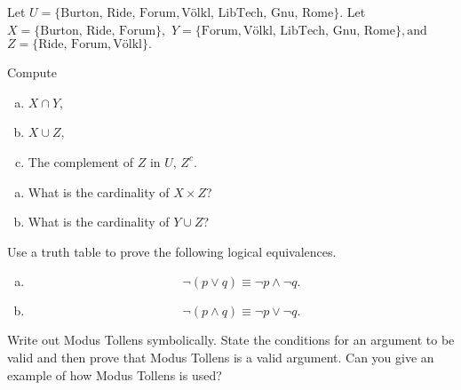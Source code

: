\documentclass[12pt]{amsart}
\begin{document}
\newpage

\noindent Let $U = \{\text{Burton},\, \text{Ride},\,\text{Forum}, \text{V\"{o}lkl},\, \text{LibTech},\, \text{Gnu},\, \text{Rome}\}$.
  Let 
  $X = \{\text{Burton},\, \text{Ride},\,\text{Forum}\},$
  $Y = \{\text{Forum}, \text{V\"{o}lkl},\, \text{LibTech},\, \text{Gnu},\, \text{Rome}\}, \text{and}$
  $Z = \{\text{Ride},\,\text{Forum}, \text{V\"{o}lkl}\}.$
\begin{thm}[18 Points]\label{ex4}
  Compute
  \begin{enumerate}[(a)]
  \item
    $X \cap Y$,
    \vspace{1in}
  \item
    $X \cup Z$,
    \vspace{1in}
  \item
    The complement of $Z$ in $U$, $Z^c$.
    \vspace{1in}
  \end{enumerate}
\end{thm}

\begin{thm}[18 Points]
  \begin{enumerate}[(a)]
  \item
    What is the cardinality of $X \times Z$?
    \vspace{1in}
  \item
    What is the cardinality of $Y \cup Z$?
    \vspace{1in}
  \end{enumerate}
\end{thm}
\newpage

\begin{thm}[18 Points]\label{ex9}
  Use a truth table to prove the following logical equivalences.
  \begin{enumerate}[(a)]
  \item
    $$\neg\left(p \vee q\right) \equiv \neg p \wedge \neg q.$$
    \vspace{2in}
  \item
    $$\neg\left(p \wedge q \right) \equiv \neg p \vee \neg q.$$
    \vspace{2in}
  \end{enumerate}
\end{thm}

\begin{thm}\label{bonus}
  Write out Modus Tollens symbolically.
  State the conditions for an argument to be valid and then prove that Modus Tollens is a valid argument.
  Can you give an example of how Modus Tollens is used?
\end{thm}
\newpage
\end{document}
